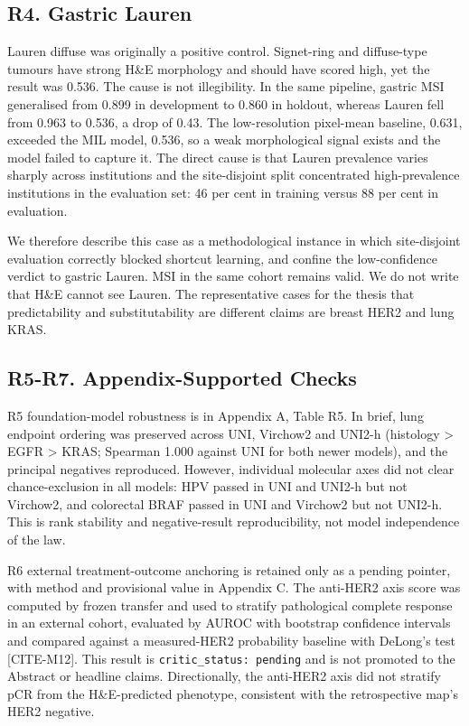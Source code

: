 \subsection*{R4. Gastric Lauren}

Lauren diffuse was originally a positive control. Signet-ring and diffuse-type tumours have strong H\&E morphology and should have scored high, yet the result was 0.536. The cause is not illegibility. In the same pipeline, gastric MSI generalised from 0.899 in development to 0.860 in holdout, whereas Lauren fell from 0.963 to 0.536, a drop of 0.43. The low-resolution pixel-mean baseline, 0.631, exceeded the MIL model, 0.536, so a weak morphological signal exists and the model failed to capture it. The direct cause is that Lauren prevalence varies sharply across institutions and the site-disjoint split concentrated high-prevalence institutions in the evaluation set: 46 per cent in training versus 88 per cent in evaluation.

We therefore describe this case as a methodological instance in which site-disjoint evaluation correctly blocked shortcut learning, and confine the low-confidence verdict to gastric Lauren. MSI in the same cohort remains valid. We do not write that H\&E cannot see Lauren. The representative cases for the thesis that predictability and substitutability are different claims are breast HER2 and lung KRAS.

\subsection*{R5-R7. Appendix-Supported Checks}

R5 foundation-model robustness is in Appendix A, Table R5. In brief, lung endpoint ordering was preserved across UNI, Virchow2 and UNI2-h (histology > EGFR > KRAS; Spearman 1.000 against UNI for both newer models), and the principal negatives reproduced. However, individual molecular axes did not clear chance-exclusion in all models: HPV passed in UNI and UNI2-h but not Virchow2, and colorectal BRAF passed in UNI and Virchow2 but not UNI2-h. This is rank stability and negative-result reproducibility, not model independence of the law.

R6 external treatment-outcome anchoring is retained only as a pending pointer, with method and provisional value in Appendix C. The anti-HER2 axis score was computed by frozen transfer and used to stratify pathological complete response in an external cohort, evaluated by AUROC with bootstrap confidence intervals and compared against a measured-HER2 probability baseline with DeLong's test [CITE-M12]. This result is \texttt{critic\_status: pending} and is not promoted to the Abstract or headline claims. Directionally, the anti-HER2 axis did not stratify pCR from the H\&E-predicted phenotype, consistent with the retrospective map's HER2 negative.

